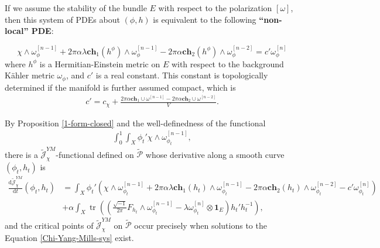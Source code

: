 \documentclass[10pt, letterpaper]{amsart}
\newcommand{\tr}{\operatorname{tr}}
\theoremstyle{plain}
\theoremstyle{definition}
\numberwithin{equation}{section}
\begin{document}
If we assume the stability of the bundle $E$ with respect to the polarization $[\omega]$, then this system of PDEs about $\left(\phi, h\right)$ is equivalent to the following {\bfseries{``non-local'' PDE}}:

\begin{equation}
\label{nonlocal-Chi-Yang-Mills-sys}
    \chi\wedge \omega_\phi^{[n-1]}
    + 
    2\pi\alpha\lambda \mathbf{ch}_1\left(h^\phi\right)\wedge \omega_\phi^{[n-1]}
    -
    2\pi\alpha \mathbf{ch}_2\left(h^\phi\right)\wedge\omega_\phi^{[n-2]}
    = 
    c'\omega_\phi^{[n]}
\end{equation}
where $h^\phi$ is a Hermitian-Einstein metric on $E$ with respect to the background K\"ahler metric $\omega_\phi$, and $c'$ is a real constant. This constant is topologically determined if the manifold is further assumed compact, which is 
\begin{align*}
    c'
    =
    c_\chi +\frac{ 2\pi\alpha \mathbf{ch}_1\cup \omega^{[n-1]} - 2\pi\alpha \mathbf{ch}_2\cup \omega^{[n-2]}}{V}.
\end{align*}

By Proposition \ref{1-form-closed} and the well-definedness of the functional 
\begin{align*}
    \int_0^1 \int_X \phi_t'\chi\wedge \omega_{\phi_t}^{[n-1]}, 
\end{align*}
there is a $\widetilde{\mathcal{J}}_\chi^{YM}$-functional defined on $\widetilde{\mathcal{P}}$ whose derivative along a smooth curve $\left(\phi_t,h_t\right)$ is 
\begin{equation}
\begin{split}
\frac{\mathrm{d}\widetilde{\mathcal{J}}_\chi^{YM}}{\mathrm{d}t}\left( \phi_t,h_t\right)
& = 
\int_X \phi_t'\left( \chi\wedge \omega_{\phi_t}^{[n-1]}
+ 
2\pi\alpha\lambda \mathbf{ch}_1\left(h_t\right) \wedge \omega_{\phi_t}^{[n-1]} 
-
2\pi\alpha\mathbf{ch}_2\left(h_t\right)\wedge\omega_{\phi_t}^{[n-2]}
-c'\omega_{\phi_t}^{[n]}
\right)\\
& + 
\alpha\int_X \tr \left( \left( \frac{\sqrt{-1}}{2\pi}F_{h_t}\wedge \omega_{\phi_t}^{[n-1]}-\lambda \omega_{\phi_t}^{[n]}\otimes \mathbf{1}_E\right) h_t'h_t^{-1}\right),
\end{split}
\end{equation}
and the critical points of $\widetilde{\mathcal{J}}_\chi^{YM}$ on $\widetilde{\mathcal{P}}$ occur precisely when solutions to the Equation \eqref{Chi-Yang-Mills-sys} exist.\\
\end{document}
